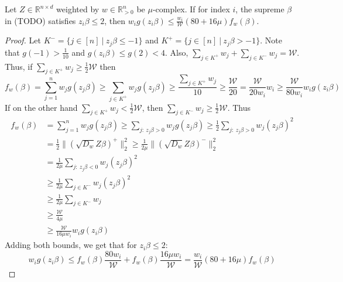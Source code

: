 \begin{lemma}
    Let $Z \in \mathbb{R}^{n \times d}$ weighted by $w \in \mathbb{R}^n_{>0}$
    be $\mu$-complex. If for index $i$, the supreme $\beta$ in (TODO) satisfies
    $z_i \beta \leq 2$, then
    $w_i g(z_i \beta) \leq \frac{w_i}{\mathcal{W}} (80 + 16 \mu) f_w(\beta)$.
\end{lemma}
\begin{proof}
    Let $K^- = \{ j \in [n] \ | \ z_j \beta \leq -1 \}$ and
    $K^+ = \{ j \in [n] \ | \ z_j \beta > -1 \}$.
    Note that $g(-1) > \frac{1}{10}$ and
    $g(z_i \beta) \leq g(2) < 4$.
    Also, $\sum_{j \in K^+} w_j + \sum_{j \in K^-} w_j = \mathcal{W}$.
    \\
    Thus, if $\sum_{j \in K^+} w_j \geq \frac{1}{2} \mathcal{W}$ then
    $$
        f_w(\beta) = \sum_{j=1}^n w_j g(z_j \beta)
        \geq \sum_{j \in K^+} w_j g(z_j \beta)
        \geq \frac{\sum_{j \in K^+} w_j}{10}
        \geq \frac{\mathcal{W}}{20}
        = \frac{\mathcal{W}}{20 w_i} w_i
        \geq \frac{\mathcal{W}}{80 w_i} w_i g(z_i \beta)
    $$
    If on the other hand $\sum_{j \in K^+} w_j < \frac{1}{2} \mathcal{W}$,
    then $\sum_{j \in K^-} w_j \geq \frac{1}{2} \mathcal{W}$. Thus
    \begin{align*}
        f_w(\beta)
         & = \sum_{j=1}^n w_j g(z_j \beta)
        \geq \sum_{j: \  z_j \beta > 0} w_j g(z_j \beta)
        \geq \frac{1}{2} \sum_{j: \  z_j \beta > 0} w_j (z_j \beta)^2    \\
         & = \frac{1}{2} \lVert (\sqrt{D_w} Z \beta)^+ \rVert_2^2
        \geq \frac{1}{2 \mu} \lVert (\sqrt{D_w} Z \beta)^- \rVert_2^2    \\
         & = \frac{1}{2 \mu} \sum_{j: \ z_j \beta < 0} w_j (z_j \beta)^2 \\
         & \geq \frac{1}{2 \mu} \sum_{j \in K^-} w_j (z_j \beta)^2       \\
         & \geq \frac{1}{2 \mu} \sum_{j \in K^-} w_j                     \\
         & \geq \frac{\mathcal{W}}{4 \mu}                                \\
         & \geq \frac{\mathcal{W}}{16 \mu w_i} w_i g(z_i \beta)
    \end{align*}
    Adding both bounds, we get that for $z_i \beta \leq 2$:
    $$
        w_i g(z_i \beta) \leq f_w(\beta) \frac{80 w_i}{\mathcal{W}}
        + f_w(\beta) \frac{16 \mu w_i}{\mathcal{W}}
        = \frac{w_i}{\mathcal{W}} (80 + 16 \mu) f_w(\beta)
    $$
\end{proof}

